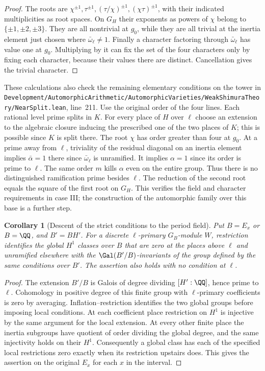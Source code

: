 \documentclass[a4paper,11pt]{article}
\newtheorem{corollary}[proposition]{Corollary}
\theoremstyle{definition}
\theoremstyle{remark}
\newcommand{\srcloc}[2]{{\small\nolinkurl{#1.lean}}, line~#2}
\numberwithin{equation}{section}
\begin{document}
\begin{proof}
The roots are \(\chi^{\pm1},\tau^{\pm1},
(\tau/\chi)^{\pm1},(\chi\tau)^{\pm1}\), with their indicated
multiplicities as root spaces. On \(G_H\) their exponents
as powers of \(\chi\) belong to \(\{\pm1,\pm2,\pm3\}\).
They are all nontrivial at \(g_0\), while they are all
trivial at the inertia element just chosen where
\(\bar\omega_\ell\ne1\). Finally a character factoring
through \(\bar\omega_\ell\) has value one at \(g_0\).
Multiplying by it can fix the set of the four characters
only by fixing each character, because their values there
are distinct. Cancellation gives the trivial character.
\end{proof}

These calculations also check the remaining elementary
conditions on the tower in
\srcloc{Development/AutomorphicArithmetic/AutomorphicVarieties/WeakShimuraTheory/NearSplit}{211}.
Use the original order of the four lines. Each rational level
prime splits in \(K\). For every place of \(H\) over \(\ell\)
choose an extension to the algebraic closure inducing the
prescribed one of the two places of \(K\); this is possible
since \(K\) is split there. The root \(\chi\) has order
greater than four at \(g_0\). At a prime away from \(\ell\),
triviality of the residual diagonal on an inertia element
implies \(\bar\alpha=1\) there since \(\bar\omega_\ell\)
is unramified. It implies \(\alpha=1\) since its order is
prime to \(\ell\). The same order \(m\) kills \(\alpha\)
even on the entire group. Thus there is no distinguished
ramification prime besides \(\ell\). The reduction of the
second root equals the square of the first root on \(G_H\).
This verifies the field and character requirements in case III;
the construction of the automorphic family over this base is
a further step.

\begin{corollary}[Descent of the strict conditions to the period field]
\leavevmode\label{cor:towerdescent571}
Put \(B=E_x\) or \(B=\QQ\), and \(B'=BH'\). For a discrete
\(\ell\)-primary \(G_B\)-module \(W\), restriction identifies
the global \(H^1\) classes over \(B\) that are zero at the
places above \(\ell\) and unramified elsewhere with the
\(\Gal(B'/B)\)-invariants of the group defined by the same
conditions over \(B'\). The assertion also holds with no
condition at \(\ell\).
\end{corollary}
\begin{proof}
The extension \(B'/B\) is Galois of degree dividing
\([H':\QQ]\), hence prime to \(\ell\). Cohomology in positive
degree of this finite group with \(\ell\)-primary coefficients
is zero by averaging. Inflation--restriction identifies the
two global groups before imposing local conditions. At each
coefficient place restriction on \(H^1\) is injective by the
same argument for the local extension. At every other finite
place the inertia subgroups have quotient of order dividing
the global degree, and the same injectivity holds on their
\(H^1\). Consequently a global class has each of the specified
local restrictions zero exactly when its restriction upstairs
does. This gives the assertion on the original \(E_x\) for
each \(x\) in the interval.
\end{proof}
\end{document}
